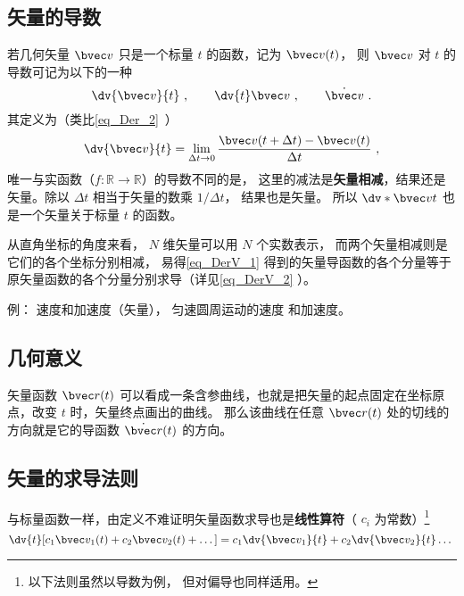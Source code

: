 
\begin{issues}
\end{issues}



\subsection{矢量的导数}

若几何矢量 $\bvec v$ 只是一个标量 $t$ 的函数，记为 $\bvec v(t)$， 则 $\bvec v$ 对 $t$ 的导数可记为以下的一种
\begin{equation}
\dv{\bvec v}{t}~, \qquad \dv{t}\bvec v~, \qquad \dot{\bvec v}~.
\end{equation}
其定义为（类比\autoref{eq_Der_2}~）
\begin{equation}\label{eq_DerV_1}
\dv{\bvec v}{t} = \lim_{\Delta t \to 0} \frac{\bvec v ( t + \Delta t) - \bvec v(t)}{\Delta t}~,
\end{equation}
唯一与实函数（$f:\mathbb R \to \mathbb R$）的导数不同的是， 这里的减法是\textbf{矢量相减}，结果还是矢量。除以 $\Delta t$ 相当于矢量的数乘 $1/\Delta t$， 结果也是矢量。 所以 $\dv*{\bvec v}{t}$ 也是一个矢量关于标量 $t$ 的函数。

从直角坐标的角度来看， $N$ 维矢量可以用 $N$ 个实数表示， 而两个矢量相减则是它们的各个坐标分别相减， 易得\autoref{eq_DerV_1} 得到的矢量导函数的各个分量等于原矢量函数的各个分量分别求导（详见\autoref{eq_DerV_2} ）。

例： 速度和加速度（矢量）， 匀速圆周运动的速度 和加速度。

\subsection{几何意义}
矢量函数 $\bvec r(t)$ 可以看成一条含参曲线，也就是把矢量的起点固定在坐标原点，改变 $t$ 时，矢量终点画出的曲线。 那么该曲线在任意 $\bvec r(t)$ 处的切线的方向就是它的导函数 $\dot{\bvec r}(t)$ 的方向。

\subsection{矢量的求导法则}
与标量函数一样，由定义不难证明矢量函数求导也是\textbf{线性算符}（ $c_i$ 为常数）\footnote{以下法则虽然以导数为例， 但对偏导也同样适用。}
\begin{equation}
\dv{t}[c_1 \bvec v_1(t) + c_2 \bvec v_2(t) + \dots] = c_1\dv{\bvec v_1}{t} + c_2\dv{\bvec v_2}{t} \dots~
\end{equation}

